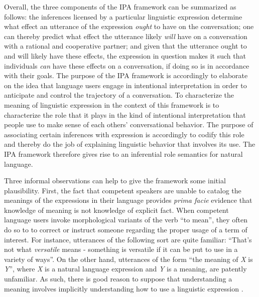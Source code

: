 Overall, the three components of the IPA framework can be summarized as follows: the inferences licensed by a particular linguistic expression determine what effect an utterance of the expression \textit{ought} to have on the conversation; one can thereby predict what effect the utterance likely \textit{will} have on a conversation with a rational and cooperative partner; and given that the utterance ought to and will likely have these effects, the expression in question makes it such that individuals \textit{can} have these effects on a conversation, if doing so is in accordance with their goals. The purpose of the IPA framework is accordingly to elaborate on the idea that language users engage in intentional interpretation in order to anticipate and control the trajectory of a conversation. To characterize the meaning of linguistic expression in the context of this framework is to characterize the role that it plays in the kind of intentional interpretation that people use to make sense of each others' conversational behavior. The purpose of associating certain inferences with expression is accordingly to codify this role and thereby do the job of explaining linguistic behavior that involves its use. The IPA framework therefore gives rise to an inferential role semantics for natural language. 

Three informal observations can help to give the framework some initial plausibility. First, the fact that competent speakers are unable to catalog the meanings of the expressions in their language provides \textit{prima facie} evidence that knowledge of meaning is not knowledge of explicit fact. When competent language users invoke morphological variants of the verb ``to mean'', they often do so to to correct or instruct someone regarding the proper usage of a term of interest. For instance, utterances of the following sort are quite familiar: ``That's not what \textit{versatile} means - something is versatile if it can be put to use in a variety of ways''. On the other hand, utterances of the form ``the meaning of \textit{X} is \textit{Y}'', where \textit{X} is a natural language expression and \textit{Y} is a meaning, are patently unfamiliar. As such, there is good reason to suppose that understanding a meaning involves implicitly understanding how to use a linguistic expression \citep{Brandom:1994,Horwich:2005}.


